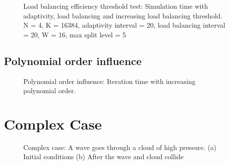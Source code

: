 \begin{figure}[H]
	\centering
	
	\caption{Load balancing efficiency threshold test: Simulation time with adaptivity, load balancing and increasing load balancing threshold. N = 4, K = 16384, adaptivity interval = 20, load balancing interval = 20, W = 16, max split level = 5}\label{fig:load_balancing_efficiency_threshold_s5}
\end{figure}

\subsection{Polynomial order influence}\label{subsection:results:load_balancing_performance:polynomial_order}

\begin{figure}[H]
	\centering
	
	\caption{Polynomial order influence: Iteration time with increasing polynomial order.}\label{fig:N_influence}
\end{figure}

\section{Complex Case}\label{section:results:complex_application}

\begin{figure}[H]
	\centering
	\hfill
	\caption{Complex case: A wave goes through a cloud of high pressure. (a) Initial conditions (b) After the wave and cloud collide}\label{fig:cloud_p}
\end{figure}

